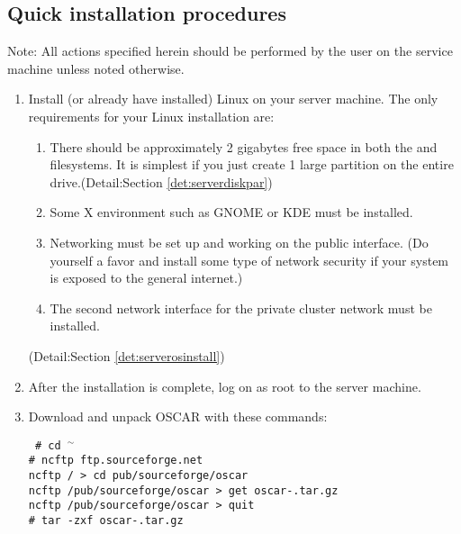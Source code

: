 \subsection{Quick installation procedures}

Note: All actions specified herein should be performed by the
 user on the service machine unless noted otherwise.

\begin {enumerate}

\item Install (or already have installed) Linux on your server machine.
The only requirements for your Linux installation are:

        \begin{enumerate}
        \item There should be approximately 2 gigabytes free space in both
        the \file{/} and  filesystems. It is simplest if you
        just create 1 large partition on the entire drive.(Detail:Section
        \ref{det:serverdiskpar})
        \item Some X environment such as GNOME or KDE must be installed.
        \item Networking must be set up and working on the public interface.
        (Do yourself a favor and install some type of network security if
        your system is exposed to the general internet.)
        \item The second network interface for the private cluster network
        must be installed.
        \end{enumerate}
(Detail:Section \ref{det:serverosinstall})

\item After the installation is complete, log on as root to the server 
machine.

\item Download and unpack OSCAR with these commands:

\vspace{11pt}
{\tt
  \# cd $^\sim$ \\
  \# ncftp ftp.sourceforge.net \\
  ncftp / > cd pub/sourceforge/oscar \\
  ncftp /pub/sourceforge/oscar > get oscar-\oscarversion.tar.gz \\
  ncftp /pub/sourceforge/oscar > quit \\
  \# tar -zxf oscar-\oscarversion.tar.gz
}
\vspace{11pt}


\end{enumerate}
